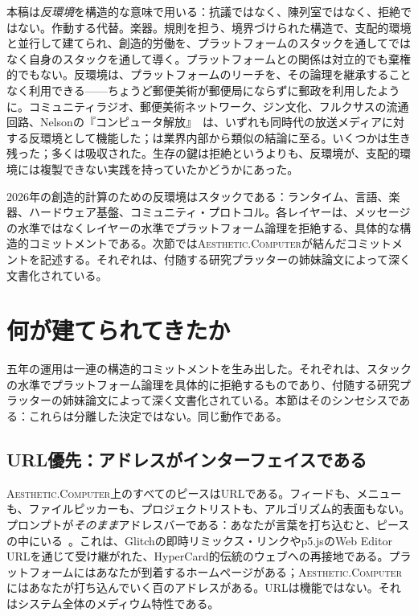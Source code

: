 \documentclass[10pt,letterpaper,twocolumn]{article}
\newcommand{\ac}{\textsc{Aesthetic.Computer}}
\begin{document}
本稿は\emph{反環境}を構造的な意味で用いる：抗議ではなく、陳列室ではなく、拒絶ではない。作動する代替。楽器。規則を担う、境界づけられた構造で、支配的環境と並行して建てられ、創造的労働を、プラットフォームのスタックを通してではなく自身のスタックを通して導く。プラットフォームとの関係は対立的でも棄権的でもない。反環境は、プラットフォームのリーチを、その論理を継承することなく利用できる——ちょうど郵便美術が郵便局にならずに郵政を利用したように。コミュニティラジオ、郵便美術ネットワーク、ジン文化、フルクサスの流通回路、Nelsonの『コンピュータ解放』~\citep{nelson1974computerlib}は、いずれも同時代の放送メディアに対する反環境として機能した；\citet{lanier2018ten}は業界内部から類似の結論に至る。いくつかは生き残った；多くは吸収された。生存の鍵は拒絶というよりも、反環境が、支配的環境には複製できない実践を持っていたかどうかにあった。

2026年の創造的計算のための反環境はスタックである：ランタイム、言語、楽器、ハードウェア基盤、コミュニティ・プロトコル。各レイヤーは、メッセージの水準ではなくレイヤーの水準でプラットフォーム論理を拒絶する、具体的な構造的コミットメントである。次節では\ac{}が結んだコミットメントを記述する。それぞれは、付随する研究プラッターの姉妹論文によって深く文書化されている。

\section{何が建てられてきたか}

五年の運用は一連の構造的コミットメントを生み出した。それぞれは、スタックの水準でプラットフォーム論理を具体的に拒絶するものであり、付随する研究プラッターの姉妹論文によって深く文書化されている。本節はそのシンセシスである：これらは分離した決定ではない。同じ動作である。

\subsection{URL優先：アドレスがインターフェイスである}

\ac{}上のすべてのピースはURLである。フィードも、メニューも、ファイルピッカーも、プロジェクトリストも、アルゴリズム的表面もない。プロンプトが\emph{そのまま}アドレスバーである：あなたが言葉を打ち込むと、ピースの中にいる~\citep{scudder2026urltradition}。これは、Glitchの即時リミックス・リンクやp5.jsのWeb Editor URLを通じて受け継がれた、HyperCard的伝統のウェブへの再接地である。プラットフォームにはあなたが到着するホームページがある；\ac{}にはあなたが打ち込んでいく百のアドレスがある。URLは機能ではない。それはシステム全体のメディウム特性である。
\end{document}
